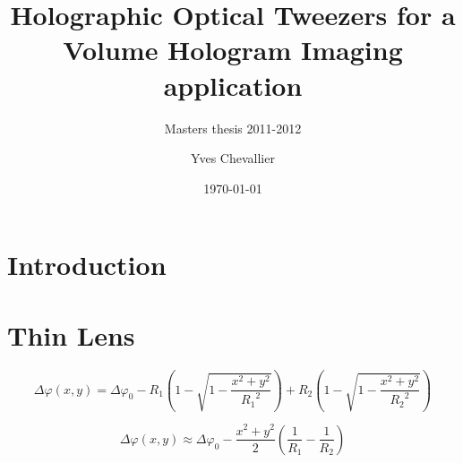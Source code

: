 \documentclass{kepfl}
\begin{document}
\date     {\today}
\author   {Yves Chevallier}
\title    {Holographic Optical Tweezers for a \\Volume Hologram Imaging application}
\subtitle {Masters thesis 2011-2012}
\maketitle
\clearpage

\begin{abstract}
\noindent

\noindent
\end{abstract}

\clearemptydoublepage
\tableofcontents
\clearpage
\listoffigures
\listoftables

\clearemptydoublepage
{}

\section{Introduction}

\section{Thin Lens}

\begin{equation}
\Delta \varphi (x,y) = \Delta {\varphi _0} - {R_1}\left( {1 - \sqrt {1 - \frac{{{x^2} + {y^2}}}{{{R_1}^2}}} } \right) + {R_2}\left( {1 - \sqrt {1 - \frac{{{x^2} + {y^2}}}{{{R_2}^2}}} } \right)
\end{equation}

\begin{equation}
\Delta \varphi (x,y) \approx \Delta {\varphi _0} - \frac{{{x^2} + {y^2}}}{2}\left( {\frac{1}{{{R_1}}} - \frac{1}{{{R_2}}}} \right)
\end{equation}
\end{document}
